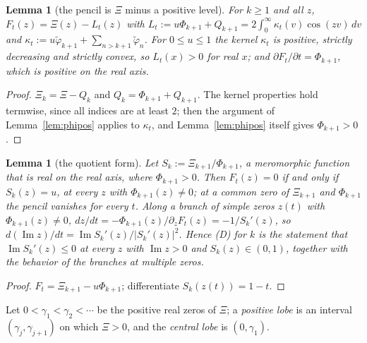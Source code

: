 \documentclass[11pt]{article}
\theoremstyle{plain}
\newtheorem{lemma}[theorem]{Lemma}
\theoremstyle{definition}
\theoremstyle{remark}
\newcommand{\im}{\operatorname{Im}}
\newcommand{\tphi}{\widetilde{\varphi}}
\begin{document}
\begin{lemma}[the pencil is $\Xi$ minus a positive level]\label{lem:level}
For $k \ge 1$ and all $z$, $F_t(z) = \Xi(z) - L_t(z)$ with
$L_t := u\Phi_{k+1} + Q_{k+1} = 2\int_0^\infty \kappa_t(v)\cos(zv)\,dv$ and
$\kappa_t := u\tphi_{k+1} + \sum_{n > k+1}\tphi_n$. For $0 \le u \le 1$ the kernel $\kappa_t$ is positive, strictly decreasing and
strictly convex, so $L_t(x) > 0$ for real $x$; and
$\partial F_t/\partial t = \Phi_{k+1}$, which is positive on the real axis.
\end{lemma}

\begin{proof}
$\Xi_k = \Xi - Q_k$ and $Q_k = \Phi_{k+1} + Q_{k+1}$. The kernel properties hold
termwise, since all indices are at least $2$; then the argument of
Lemma~\ref{lem:phipos} applies to $\kappa_t$, and Lemma~\ref{lem:phipos} itself
gives $\Phi_{k+1} > 0$.
\end{proof}

\begin{lemma}[the quotient form]\label{lem:quot}
Let $S_k := \Xi_{k+1}/\Phi_{k+1}$, a meromorphic function that is real on the
real axis, where $\Phi_{k+1} > 0$. Then $F_t(z) = 0$ if and only if
$S_k(z) = u$, at every $z$ with $\Phi_{k+1}(z) \ne 0$; at a common zero of
$\Xi_{k+1}$ and $\Phi_{k+1}$ the pencil vanishes for every $t$. Along a branch
of simple zeros $z(t)$ with $\Phi_{k+1}(z) \ne 0$,
$dz/dt = -\Phi_{k+1}(z)/\partial_z F_t(z) = -1/S_k'(z)$, so
$d(\im z)/dt = \im S_k'(z)/|S_k'(z)|^2$. Hence (D) for $k$ is the statement that $\im S_k'(z) \le 0$ at every $z$ with
$\im z > 0$ and $S_k(z) \in (0,1)$, together with the behavior of the branches
at multiple zeros.
\end{lemma}

\begin{proof}
$F_t = \Xi_{k+1} - u\Phi_{k+1}$; differentiate $S_k(z(t)) = 1 - t$.
\end{proof}

Let $0 < \gamma_1 < \gamma_2 < \cdots$ be the positive real zeros of $\Xi$; a
\emph{positive lobe} is an interval $(\gamma_j, \gamma_{j+1})$ on which
$\Xi > 0$, and the \emph{central lobe} is $(0, \gamma_1)$.
\end{document}
